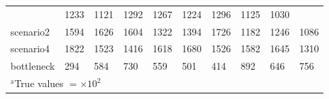 \begin{table}[t]
\begin{center}
\begin{tabular}{llllllllll}
           & 1233
        
           & 1121
        
           & 1292
        
           & 1267
        
           & 1224
        
           & 1296
        
           & 1125
        
           & 1030
         \\

        scenario2
        
           & 1594
        
           & 1626
        
           & 1604
        
           & 1322
        
           & 1394
        
           & 1726
        
           & 1182
        
           & 1246
        
           & 1086
         \\

        scenario4
        
           & 1822
        
           & 1523
        
           & 1416
        
           & 1618
        
           & 1680
        
           & 1526
        
           & 1582
        
           & 1645
        
           & 1310
         \\

        bottleneck
        
           & 294
        
           & 584
        
           & 730
        
           & 559
        
           & 501
        
           & 414
        
           & 892
        
           & 646
        
           & 756
         \\


\multicolumn{10}{l}{$^{\mathrm{a}}$True values $ = \times 10^{2}$}
\end{tabular}
\end{center}
\label{T:popresults}
\end{table}

